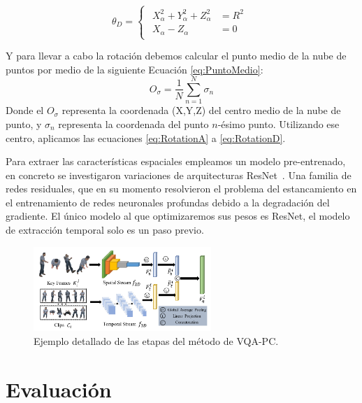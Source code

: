 \begin{equation}
  \theta_D = 
\begin{cases}
\begin{aligned}
   X_\alpha^2 + Y_\alpha^2 + Z_\alpha^2 & = R^2 \\ 
    X_\alpha - Z_\alpha & = 0 
\end{aligned}
\end{cases}
\label{eq:RotationD}
\end{equation}

Y para llevar a cabo la rotación debemos calcular el punto medio de la nube 
de puntos por medio de la siguiente Ecuación \eqref{eq:PuntoMedio}:
\begin{equation}
  O_\sigma = \frac{1}{N}\sum_{n=1}^N \sigma_n
  \label{eq:PuntoMedio}
\end{equation}
Donde el $O_\sigma$ representa la coordenada (X,Y,Z) del centro medio de la 
nube de punto, y $\sigma_n$ representa la coordenada del punto $n$-ésimo punto. 
Utilizando ese centro, aplicamos las ecuaciones \eqref{eq:RotationA} a \eqref{eq:RotationD}.

Para extraer las características espaciales empleamos un modelo pre-entrenado, 
en concreto se investigaron variaciones de arquitecturas ResNet~\cite{ResNet}. Una 
familia de redes residuales, que en su momento resolvieron el problema 
del estancamiento en el entrenamiento de redes neuronales profundas debido 
a la degradación del gradiente. El único modelo al que optimizaremos sus pesos es 
ResNet, el modelo de extracción temporal solo es un paso previo.

\begin{figure}[H]
  \begin{center}
    \includegraphics[width=0.60\textwidth]{imagenes/chapter4/PipelineCompleto}
  \end{center}
  \caption{Ejemplo detallado de las etapas del método de VQA-PC.}
  \label{fig:VQAPipeline}
\end{figure}

\section{Evaluación}
